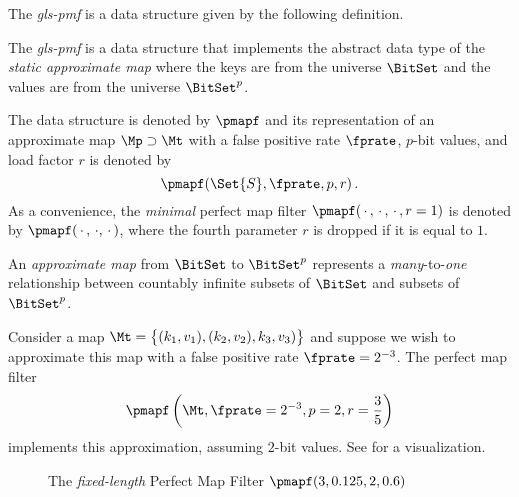 \documentclass[ ../main.tex]{subfiles}
\begin{document}
The \emph{\gls{gls-pmf}} is a data structure given by the following definition.
\begin{definition}
The \emph{\gls{gls-pmf}} is a data structure that implements the abstract data type of the \emph{static approximate map} where the keys are from the universe $\BitSet$ and the values are from the universe $\BitSet^p$.

The data structure is denoted by $\pmapf$ and its representation of an approximate map $\Mp \supset \Mt$ with a false positive rate $\fprate$, $p$-bit values, and load factor $r$ is denoted by
\begin{equation}
    \pmapf(\Set{S}, \fprate, p, r)\,.
\end{equation}
As a convenience, the \emph{minimal} perfect map filter $\pmapf(\,\cdot\,,\,\cdot\,,\,\cdot\,,r=1)$ is denoted by $\pmapf(\,\cdot\,,\,\cdot,\,\cdot\,)$, where the fourth parameter $r$ is dropped if it is equal to $1$.
\end{definition}


An \emph{approximate map} from $\BitSet$ to $\BitSet^p$ represents a \emph{many}-to-\emph{one} relationship between countably infinite subsets of $\BitSet$ and subsets of $\BitSet^p$.

\begin{example}
Consider a map $\Mt = \left\{(k_1, v_1), (k_2, v_2), k_3, v_3)\right\}$ and suppose we wish to approximate this map with a false positive rate $\fprate = 2^{-3}$. The perfect map filter
\[
    \pmapf\left(\Mt, \fprate = 2^{-3}, p=2, r=\frac{3}{5}\right)
\]
implements this approximation, assuming $2$-bit values. See  for a visualization.
\end{example}
\begin{figure}
\caption{The \emph{fixed-length} Perfect Map Filter \protect$\pmapf\!\left(3,0.125,2,0.6\right)$}
\label{fig:pmapfilter}
\centering

\end{figure}
\end{document}
